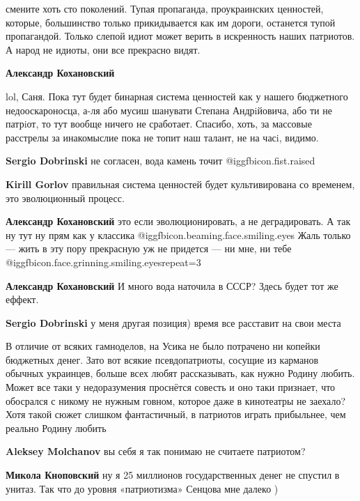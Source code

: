 \begin{itemize}
\begin{itemize}
смените хоть сто поколений. Тупая пропаганда, проукраинских ценностей, которые,
большинство только прикидывается как им дороги, останется тупой пропагандой.
Только слепой идиот может верить в искренность наших патриотов. А народ не
идиоты, они все прекрасно видят.

\textbf{Александр Кохановский} 

lol, Саня. Пока тут будет бинарная система ценностей как у нашего бюджетного
недооскароносца, а-ля або мусиш шанувати Степана Андрiйовича, або ти не
патрiот, то тут вообще ничего не сработает. Спасибо, хоть, за массовые
расстрелы за инакомыслие пока не топит наш талант, не на часi, видимо.


\textbf{Sergio Dobrinski} не согласен, вода камень точит @igg{fbicon.fist.raised}

\textbf{Kirill Gorlov} правильная система ценностей будет культивирована со временем, это эволюционный процесс.

\textbf{Александр Кохановский} это если эволюционировать, а не деградировать. А так ну тут ну прям как у классика @igg{fbicon.beaming.face.smiling.eyes} 
Жаль только — жить в эту пору прекрасную уж не придется — ни мне, ни тебе @igg{fbicon.face.grinning.smiling.eyes}{repeat=3} 

\textbf{Александр Кохановский} И много вода наточила в СССР? Здесь будет тот же еффект.

\textbf{Sergio Dobrinski} у меня другая позиция) время все расставит на свои места

\end{itemize} %


В отличие от всяких гамноделов, на Усика не было потрачено ни копейки бюджетных
денег. Зато вот всякие псевдопатриоты, сосущие из карманов обычных украинцев,
больше всех любят рассказывать, как нужно Родину любить. Может все таки у
недоразумения проснётся совесть и оно таки признает, что обосрался с никому не
нужным говном, которое даже в кинотеатры не заехало? Хотя такой сюжет слишком
фантастичный, в патриотов играть прибыльнее, чем реально Родину любить

\begin{itemize} %
\textbf{Aleksey Molchanov} вы себя я так понимаю не считаете патриотом?

\textbf{Микола Кноповский} ну я 25 миллионов государственных денег не спустил в унитаз. Так что до уровня «патриотизма» Сенцова мне далеко )


\end{itemize}
\end{itemize}
